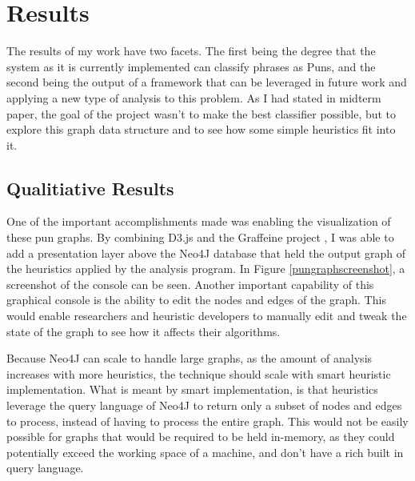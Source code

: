 \section{Results}
The results of my work have two facets. The first being the degree that the system as it is currently implemented can classify phrases as Puns, and the second being the output of a framework that can be leveraged in future work and applying a new type of analysis to this problem. As I had stated in midterm  paper, the goal of the project wasn't to make the best classifier possible, but to explore this graph data structure and to see how some simple heuristics fit into it.

\subsection{Qualitiative Results}
One of the important accomplishments made was enabling the visualization of these pun graphs. By combining D3.js and the Graffeine project \cite{graffeine}, I was able to add a presentation layer above the Neo4J database that held the output graph of the heuristics applied by the analysis program. In Figure \ref{pungraphscreenshot}, a screenshot of the console can be seen. Another important capability of this graphical console is the ability to edit the nodes and edges of the graph. This would enable researchers and heuristic developers to manually edit and tweak the state of the graph to see how it affects their algorithms.

Because Neo4J can scale to handle large graphs, as the amount of analysis increases with more heuristics, the technique should scale with smart heuristic implementation. What is meant by smart implementation, is that heuristics leverage the query language of Neo4J to return only a subset of nodes and edges to process, instead of having to process the entire graph. This would not be easily possible for graphs that would be required to be held in-memory, as they could potentially exceed the working space of a machine, and don't have a rich built in query language.

